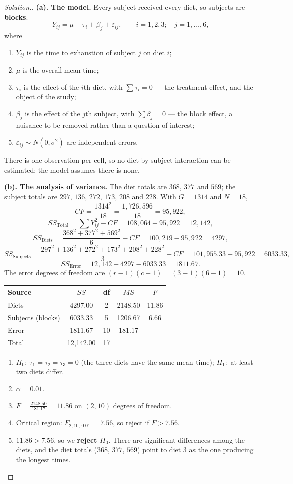 \documentclass[11pt,a4paper]{article}
\theoremstyle{definition}
\newenvironment{solution}
  {\renewcommand{\qedsymbol}{}\begin{proof}[\textit{Solution}.]}
  {\end{proof}}
\begin{document}
\begin{solution}
\textbf{(a). The model.} Every subject received every diet, so subjects are \textbf{blocks}:
\[Y_{ij}=\mu+\tau_i+\beta_j+\varepsilon_{ij},\qquad i=1,2,3;\quad j=1,\ldots,6,\]
where
\begin{enumerate}
\item[$\bullet$] $Y_{ij}$ is the time to exhaustion of subject $j$ on diet $i$;
\item[$\bullet$] $\mu$ is the overall mean time;
\item[$\bullet$] $\tau_i$ is the effect of the $i$th diet, with $\sum\tau_i=0$ --- the
treatment effect, and the object of the study;
\item[$\bullet$] $\beta_j$ is the effect of the $j$th subject, with $\sum\beta_j=0$ --- the
block effect, a nuisance to be removed rather than a question of interest;
\item[$\bullet$] $\varepsilon_{ij}\sim N(0,\sigma^2)$ are independent errors.
\end{enumerate}
There is one observation per cell, so no diet-by-subject interaction can be estimated; the
model assumes there is none.

\textbf{(b). The analysis of variance.} The diet totals are $368$, $377$ and $569$; the
subject totals are $297$, $136$, $272$, $173$, $208$ and $228$. With $G=1314$ and $N=18$,
\[CF=\frac{1314^2}{18}=\frac{1{,}726{,}596}{18}=95{,}922,\]
\[SS_{\text{Total}}=\sum Y_{ij}^2-CF=108{,}064-95{,}922=12{,}142,\]
\[SS_{\text{Diets}}=\frac{368^2+377^2+569^2}{6}-CF=100{,}219-95{,}922=4297,\]
\[SS_{\text{Subjects}}=\frac{297^2+136^2+272^2+173^2+208^2+228^2}{3}-CF
=101{,}955.33-95{,}922=6033.33,\]
\[SS_{\text{Error}}=12{,}142-4297-6033.33=1811.67.\]
The error degrees of freedom are $(r-1)(c-1)=(3-1)(6-1)=10$.
\begin{table}[H]
\centering
\begin{tabular}{lcccc}
Source & $SS$ & df & $MS$ & $F$\\
\hline
Diets & 4297.00 & 2 & 2148.50 & 11.86\\
Subjects (blocks) & 6033.33 & 5 & 1206.67 & 6.66\\
Error & 1811.67 & 10 & 181.17 & \\
\hline
Total & 12{,}142.00 & 17 & & \\
\end{tabular}
\end{table}
\begin{enumerate}
\item $H_0:\ \tau_1=\tau_2=\tau_3=0$ (the three diets have the same mean time);
$H_1:$ at least two diets differ.
\item $\alpha=0.01$.
\item $F=\frac{2148.50}{181.17}=11.86$ on $(2,10)$ degrees of freedom.
\item Critical region: $F_{2,10,\,0.01}=7.56$, so reject if $F>7.56$.
\item $11.86>7.56$, so we \textbf{reject} $H_0$. There are significant differences among the
diets, and the diet totals ($368$, $377$, $569$) point to diet 3 as the one producing the
longest times.
\end{enumerate}


\end{solution}
\end{document}
